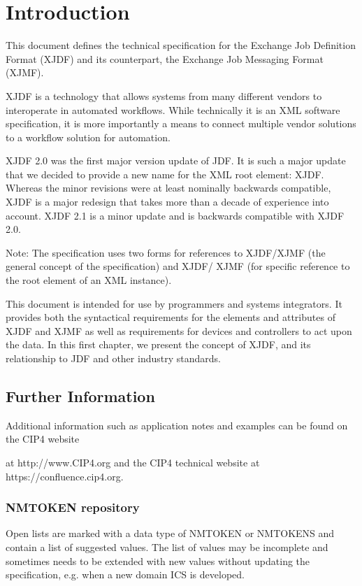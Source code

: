 \chapter{Introduction}
This document defines the technical specification for the Exchange Job Definition Format (XJDF) and its counterpart, the Exchange Job Messaging Format (XJMF).

XJDF is a technology that allows systems from many different vendors to interoperate in automated workflows. While technically it is an XML software specification, it is more importantly a means to connect multiple vendor solutions to a workflow solution for automation.

XJDF 2.0 was the first major version update of JDF. It is such a major update that we decided to provide a new name for the XML root element: XJDF. Whereas the minor revisions were at least nominally backwards compatible, XJDF is a major redesign that takes more than a decade of experience into account. XJDF 2.1 is a minor update and is backwards compatible with XJDF 2.0.

Note: The specification uses two forms for references to XJDF/XJMF (the general concept of the specification) and XJDF/ XJMF (for specific reference to the root element of an XML instance).

This document is intended for use by programmers and systems integrators. It provides both the syntactical requirements for the elements and attributes of XJDF and XJMF as well as requirements for devices and controllers to act upon the data. In this first chapter, we present the concept of XJDF, and its relationship to JDF and other industry standards.


\section{Further Information}
Additional information such as application notes and examples can be found on the CIP4 website 

at http://www.CIP4.org and the CIP4 technical website at https://confluence.cip4.org.


\subsection{NMTOKEN repository}
Open lists are marked with a data type of NMTOKEN or NMTOKENS and contain a list of suggested values. The list of values may be incomplete and sometimes needs to be extended with new values without updating the specification, e.g. when a new domain ICS is developed.

